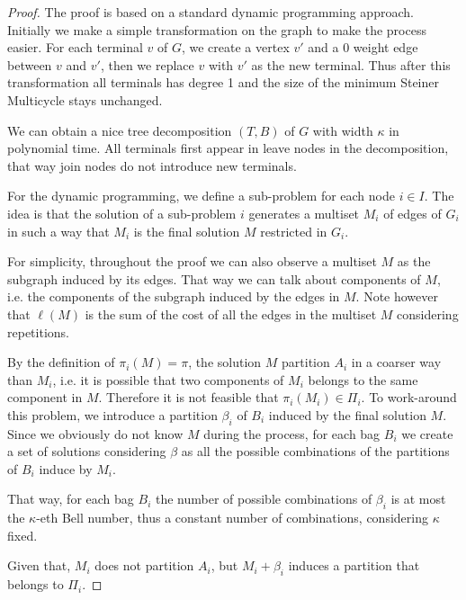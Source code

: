 \begin{proof}

The proof is based on a standard dynamic programming approach. Initially we make a simple transformation on the graph to make the process easier. For each terminal \(v\) of \(G\), we create a vertex \(v'\) and a 0 weight edge between \(v\) and \(v'\), then we replace \(v\) with \(v'\) as the new terminal. Thus after this transformation all terminals has degree 1 and the size of the minimum Steiner Multicycle stays unchanged.

We can obtain a nice tree decomposition \((T, B)\) of \(G\) with width \(\kappa\) in polynomial time. All terminals first appear in leave nodes in the decomposition, that way join nodes do not introduce new terminals.

For the dynamic programming, we define a sub-problem for each node \(i \in I\). The idea is that the solution of a sub-problem \(i\) generates a multiset \(M_i\) of edges of \(G_i\) in such a way that \(M_i\) is the final solution \(M\) restricted in \(G_i\).

For simplicity, throughout the proof we can also observe a multiset \(M\) as the subgraph induced by its edges. That way we can talk about components of \(M\), i.e. the components of the subgraph induced by the edges in \(M\). Note however that \(\ell(M)\) is the sum of the cost of all the edges in the multiset \(M\) considering repetitions.

By the definition of \(\pi_i(M) = \pi\), the solution \(M\) partition \(A_i\) in a coarser way than \(M_i\), i.e. it is possible that two components of \(M_i\) belongs to the same component in \(M\). Therefore it is not feasible that \(\pi_i(M_i) \in \Pi_i\). To work-around this problem, we introduce a partition \(\beta_i\) of \(B_i\) induced by the final solution \(M\). Since we obviously do not know \(M\) during the process, for each bag \(B_i\) we create a set of solutions considering \(\beta\) as all the possible combinations of the partitions of \(B_i\) induce by \(M_i\).

That way, for each bag \(B_i\) the number of possible combinations of \(\beta_i\) is at most the \(\kappa\)-eth Bell number, thus a constant number of combinations, considering \(\kappa\) fixed.

Given that, \(M_i\) does not partition \(A_i\), but \(M_i + \beta_i\) induces a partition that belongs to \(\Pi_i\).


\end{proof}
